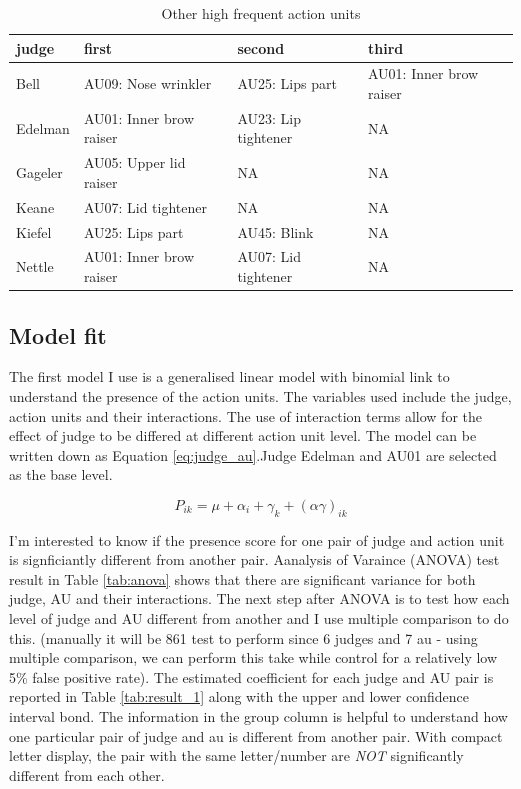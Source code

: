 \documentclass{monashthesis}
\begin{document}
\begin{table}[t]

\caption{\label{tab:unnamed-chunk-7}\label{tab:other_highf} Other high frequent action units }
\centering
\begin{tabular}{l|l|l|l}
\hline
judge & first & second & third\\
\hline
Bell & AU09: Nose wrinkler & AU25: Lips part & AU01: Inner brow raiser\\
\hline
Edelman & AU01: Inner brow raiser & AU23: Lip tightener & NA\\
\hline
Gageler & AU05: Upper lid raiser & NA & NA\\
\hline
Keane & AU07: Lid tightener & NA & NA\\
\hline
Kiefel & AU25: Lips part & AU45: Blink & NA\\
\hline
Nettle & AU01: Inner brow raiser & AU07: Lid tightener & NA\\
\hline
\end{tabular}
\end{table}

\hypertarget{model-fit}{%
\subsection{Model fit}\label{model-fit}}

The first model I use is a generalised linear model with binomial link to understand the presence of the action units. The variables used include the judge, action units and their interactions. The use of interaction terms allow for the effect of judge to be differed at different action unit level. The model can be written down as Equation \ref{eq:judge_au}.Judge Edelman and AU01 are selected as the base level.

\begin{equation}\label{eq:judge_au}
P_{ik} = \mu + \alpha_i + \gamma_k + (\alpha\gamma)_{ik}
\end{equation}

I'm interested to know if the presence score for one pair of judge and action unit is signficiantly different from another pair. Aanalysis of Varaince (ANOVA) test result in Table \ref{tab:anova} shows that there are significant variance for both judge, AU and their interactions. The next step after ANOVA is to test how each level of judge and AU different from another and I use multiple comparison to do this. (manually it will be 861 test to perform since 6 judges and 7 au - using multiple comparison, we can perform this take while control for a relatively low 5\% false positive rate). The estimated coefficient for each judge and AU pair is reported in Table \ref{tab:result_1} along with the upper and lower confidence interval bond. The information in the group column is helpful to understand how one particular pair of judge and au is different from another pair. With compact letter display, the pair with the same letter/number are \emph{NOT} significantly different from each other.
\end{document}
